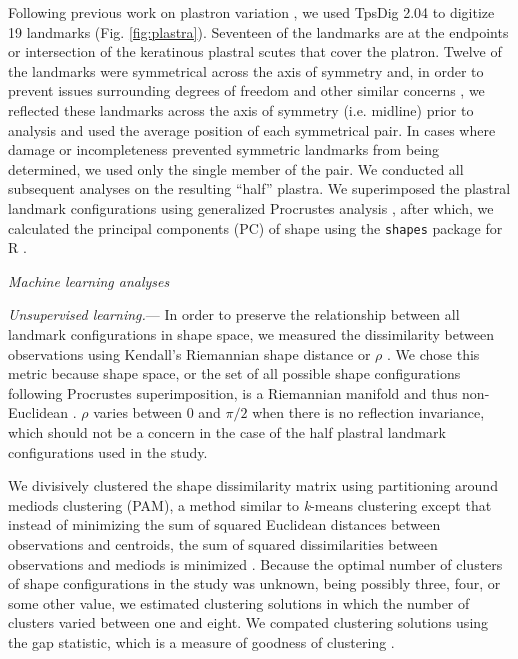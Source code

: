 \documentclass[12pt,letterpaper]{article}
\renewcommand{\subsection}[1]{%
\bigskip
\begin{center}
\begin{large}
\normalfont\itshape #1
\end{large}
\end{center}}
\renewcommand{\subsubsection}[1]{%
\vspace{2ex}
\noindent
\textit{#1.}---}
\begin{document}
Following previous work on plastron variation \citep{Angielczyk2007,Angielczyk2011,Angielczyk2013a}, we used TpsDig 2.04 \citep{Rohlf2005} to digitize 19 landmarks (Fig. \ref{fig:plastra}). Seventeen of the landmarks are at the endpoints or intersection of the keratinous plastral scutes that cover the platron. Twelve of the landmarks were symmetrical across the axis of symmetry and, in order to prevent issues surrounding degrees of freedom and other similar concerns \citep{Klingenberg2002}, we reflected these landmarks across the axis of symmetry (i.e. midline) prior to analysis and used the average position of each symmetrical pair. In cases where damage or incompleteness prevented symmetric landmarks from being determined, we used only the single member of the pair. We conducted all subsequent analyses on the resulting ``half'' plastra. We superimposed the plastral landmark configurations using generalized Procrustes analysis \citep{Dryden1998a}, after which, we calculated the principal components (PC) of shape using the \texttt{shapes} package for R \citep{2013,Dryden2013}.


\subsection{Machine learning analyses}
\subsubsection{Unsupervised learning}
In order to preserve the relationship between all landmark configurations in shape space, we measured the dissimilarity between observations using Kendall's Riemannian shape distance or \(\rho\) \citep{Kendall1984a,Dryden1998a}. We chose this metric because shape space, or the set of all possible shape configurations following Procrustes superimposition, is a Riemannian manifold and thus non-Euclidean \citep{Dryden1998a}. \(\rho\) varies between 0 and \(\pi / 2\) when there is no reflection invariance, which should not be a concern in the case of the half plastral landmark configurations used in the study.

We divisively clustered the shape dissimilarity matrix using partitioning around mediods clustering (PAM), a method similar to \textit{k}-means clustering except that instead of minimizing the sum of squared Euclidean distances between observations and centroids, the sum of squared dissimilarities between observations and mediods is minimized \citep{Kaufman1990}. Because the optimal number of clusters of shape configurations in the study was unknown, being possibly three, four, or some other value, we estimated clustering solutions in which the number of clusters varied between one and eight. We compated clustering solutions using the gap statistic, which is a measure of goodness of clustering \citep{Tibshirani2001a}.
\end{document}
